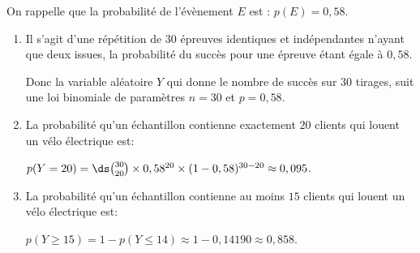 \begin{enumerate}
On rappelle que la probabilité de l'évènement $E$ est : $p(E) = 0,58$.
	\begin{enumerate}
		\item 
Il s'agit d'une répétition de 30 épreuves identiques et indépendantes n'ayant que deux issues, la probabilité du succès pour une épreuve étant égale à $0,58$.		
		
		Donc la variable aléatoire $Y$ qui donne le nombre de succès sur 30 tirages, suit une loi binomiale de paramètres $n=30$ et $p=0,58$.
				
		\item La probabilité qu'un échantillon contienne exactement $20$ clients qui louent un vélo électrique est:
		
$p(Y=20) = \ds\binom{30}{20}\times 0,58^{20}	\times (1-0,58)^{30-20}
\approx 0,095$.

		\item La probabilité qu'un échantillon contienne au moins $15$ clients qui louent un vélo électrique est:

$p(Y\geqslant 15) = 1 - p(Y\leqslant 14)\approx 1 - 0,14190 \approx 0,858$.

	\end{enumerate}

\end{enumerate}
